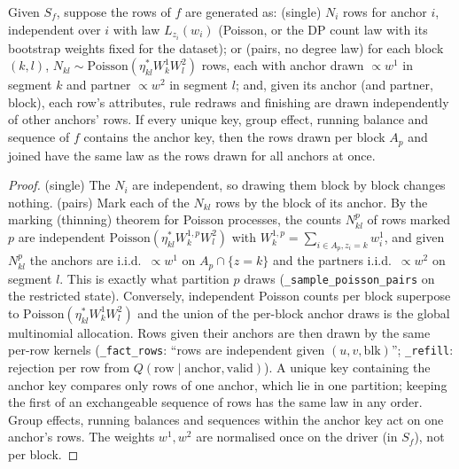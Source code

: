 \begin{proposition}\label{prop:rtlaw}
Given $S_f$, suppose the rows of $f$ are generated as: (single) $N_i$ rows for anchor $i$, independent over $i$ with law $L_{z_i}(w_i)$ (Poisson, or the DP count law with its bootstrap weights fixed for the dataset); or (pairs, no degree law) for each block $(k,l)$, $N_{kl}\sim\mathrm{Poisson}(\eta^*_{kl}W^1_kW^2_l)$ rows, each with anchor drawn $\propto w^1$ in segment $k$ and partner $\propto w^2$ in segment $l$; and, given its anchor (and partner, block), each row's attributes, rule redraws and finishing are drawn independently of other anchors' rows. If every unique key, group effect, running balance and sequence of $f$ contains the anchor key, then the rows drawn per block $A_p$ and joined have the same law as the rows drawn for all anchors at once.
\end{proposition}
\begin{proof}
(single) The $N_i$ are independent, so drawing them block by block changes nothing. (pairs) Mark each of the $N_{kl}$ rows by the block of its anchor. By the marking (thinning) theorem for Poisson processes, the counts $N^p_{kl}$ of rows marked $p$ are independent $\mathrm{Poisson}(\eta^*_{kl}W^{1,p}_kW^2_l)$ with $W^{1,p}_k=\sum_{i\in A_p,z_i=k}w^1_i$, and given $N^p_{kl}$ the anchors are i.i.d.\ $\propto w^1$ on $A_p\cap\{z=k\}$ and the partners i.i.d.\ $\propto w^2$ on segment $l$. This is exactly what partition $p$ draws (\texttt{\_sample\_poisson\_pairs} on the restricted state). Conversely, independent Poisson counts per block superpose to $\mathrm{Poisson}(\eta^*_{kl}W^1_kW^2_l)$ and the union of the per-block anchor draws is the global multinomial allocation. Rows given their anchors are then drawn by the same per-row kernels (\texttt{\_fact\_rows}: ``rows are independent given $(u,v,\mathrm{blk})$''; \texttt{\_refill}: rejection per row from $Q(\text{row}\mid\text{anchor},\text{valid})$). A unique key containing the anchor key compares only rows of one anchor, which lie in one partition; keeping the first of an exchangeable sequence of rows has the same law in any order. Group effects, running balances and sequences within the anchor key act on one anchor's rows. The weights $w^1,w^2$ are normalised once on the driver (in $S_f$), not per block.
\end{proof}


